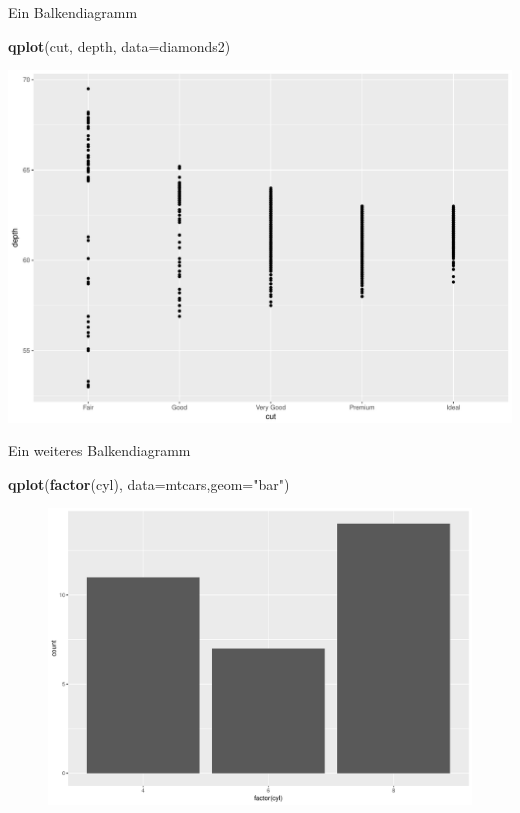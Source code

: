 \documentclass[ignorenonframetext,]{beamer}
\newenvironment{Shaded}{}{}
\newcommand{\KeywordTok}[1]{\textcolor[rgb]{0.00,0.44,0.13}{\textbf{{#1}}}}
\newcommand{\DataTypeTok}[1]{\textcolor[rgb]{0.56,0.13,0.00}{{#1}}}
\newcommand{\StringTok}[1]{\textcolor[rgb]{0.25,0.44,0.63}{{#1}}}
\newcommand{\NormalTok}[1]{{#1}}
\begin{document}
\begin{frame}[fragile]{Ein Balkendiagramm}

\begin{Shaded}
\begin{Highlighting}[]
\KeywordTok{qplot}\NormalTok{(cut, depth, }\DataTypeTok{data=}\NormalTok{diamonds2)}
\end{Highlighting}
\end{Shaded}

\includegraphics{RSocialScience2_files/figure-beamer/unnamed-chunk-11-1.pdf}

\end{frame}

\begin{frame}[fragile]{Ein weiteres Balkendiagramm}

\begin{Shaded}
\begin{Highlighting}[]
\KeywordTok{qplot}\NormalTok{(}\KeywordTok{factor}\NormalTok{(cyl), }\DataTypeTok{data=}\NormalTok{mtcars,}\DataTypeTok{geom=}\StringTok{"bar"}\NormalTok{)}
\end{Highlighting}
\end{Shaded}

\begin{figure}[htbp]
\centering
\includegraphics{RSocialScience2_files/figure-beamer/unnamed-chunk-12-1.pdf}
\caption{}
\end{figure}

\end{frame}
\end{document}
